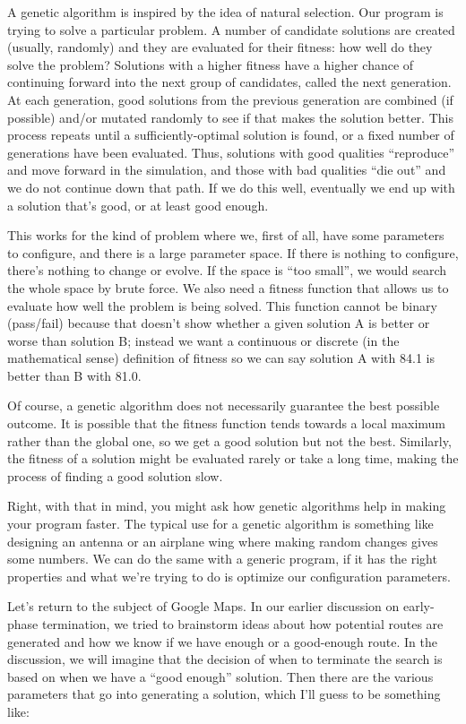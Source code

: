 A genetic algorithm is inspired by the idea of natural selection. Our program is trying to solve a particular problem. A number of candidate solutions are created (usually, randomly) and they are evaluated for their fitness: how well do they solve the problem? Solutions with a higher fitness have a higher chance of continuing forward into the next group of candidates, called the next generation. At each generation, good solutions from the previous generation are combined (if possible) and/or mutated randomly to see if that makes the solution better. This process repeats until a sufficiently-optimal solution is found, or a fixed number of generations have been evaluated. Thus, solutions with good qualities ``reproduce'' and move forward in the simulation, and those with bad qualities ``die out'' and we do not continue down that path. If we do this well, eventually we end up with a solution that's good, or at least good enough.

This works for the kind of problem where we, first of all, have some parameters to configure, and there is a large parameter space. If there is nothing to configure, there's nothing to change or evolve. If the space is ``too small'', we would search the whole space by brute force. We also need a fitness function that allows us to evaluate how well the problem is being solved. This function cannot be binary (pass/fail) because that doesn't show whether a given solution A is better or worse than solution B; instead we want a continuous or discrete (in the mathematical sense) definition of fitness so we can say solution A with 84.1 is better than B with 81.0.

Of course, a genetic algorithm does not necessarily guarantee the best possible outcome. It is possible that the fitness function tends towards a local maximum rather than the global one, so we get a good solution but not the best. Similarly, the fitness of a solution might be evaluated rarely or take a long time, making the process of finding a good solution slow.

Right, with that in mind, you might ask how genetic algorithms help in making your program faster. The typical use for a genetic algorithm is something like designing an antenna or an airplane wing where making random changes gives some numbers. We can do the same with a generic program, if it has the right properties and what we're trying to do is optimize our configuration parameters.

Let's return to the subject of Google Maps. In our earlier discussion on early-phase termination, we tried to brainstorm ideas about how potential routes are generated and how we know if we have enough or a good-enough route. In the discussion, we will imagine that the decision of when to terminate the search is based on when we have a ``good enough'' solution. Then there are the various parameters that go into generating a solution, which I'll guess to be something like:

